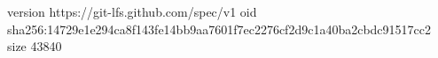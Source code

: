 version https://git-lfs.github.com/spec/v1
oid sha256:14729e1e294ca8f143fe14bb9aa7601f7ec2276cf2d9c1a40ba2cbdc91517cc2
size 43840
